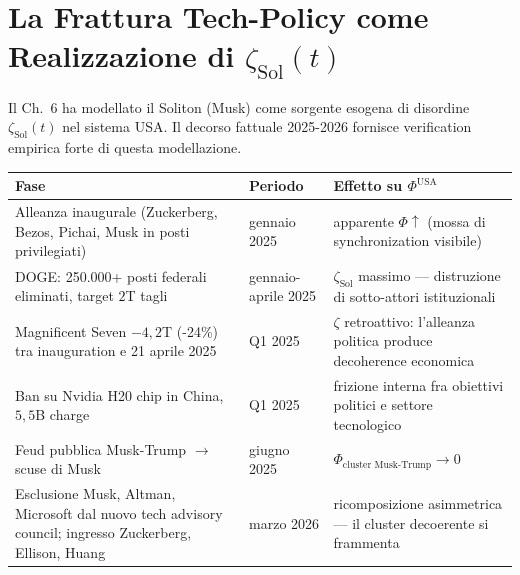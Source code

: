 \section{\texorpdfstring{La Frattura Tech-Policy come Realizzazione di
\(\zeta_{\text{Sol}}(t)\)}{La Frattura Tech-Policy come Realizzazione di \textbackslash zeta\_\{\textbackslash text\{Sol\}\}(t)}}\label{la-frattura-tech-policy-come-realizzazione-di-zeta_textsolt}

Il Ch.~6 ha modellato il Soliton (Musk) come sorgente esogena di
disordine \(\zeta_{\text{Sol}}(t)\) nel sistema USA. Il decorso fattuale
2025-2026 fornisce verification empirica forte di questa modellazione.

{\def\LTcaptype{none} %
{\small\begin{longtable}[]{@{}
  >{\raggedright\arraybackslash}p{}
  >{\raggedright\arraybackslash}p{}
  >{\raggedright\arraybackslash}p{}@{}}
\toprule\noalign{}
\begin{minipage}[b]{\linewidth}\raggedright
Fase
\end{minipage} & \begin{minipage}[b]{\linewidth}\raggedright
Periodo
\end{minipage} & \begin{minipage}[b]{\linewidth}\raggedright
Effetto su \(\Phi^{\text{USA}}\)
\end{minipage} \\
\midrule\noalign{}
\endhead
\bottomrule\noalign{}
\endlastfoot
Alleanza inaugurale (Zuckerberg, Bezos, Pichai, Musk in posti
privilegiati) & 20 gennaio 2025 & apparente \(\Phi \uparrow\) (mossa di
synchronization visibile) \\
DOGE: 250.000+ posti federali eliminati, target \(2\)T tagli &
gennaio-aprile 2025 & \(\zeta_{\text{Sol}}\) massimo --- distruzione di
sotto-attori istituzionali \\
Magnificent Seven \(-4{,}2\)T (-24\%) tra inauguration e 21 aprile 2025
& Q1 2025 & \(\zeta\) retroattivo: l'alleanza politica produce
decoherence economica \\
Ban su Nvidia H20 chip in China, \(5{,}5\)B charge & Q1 2025 & frizione
interna fra obiettivi politici e settore tecnologico \\
Feud pubblica Musk-Trump $\to$ scuse di Musk & giugno 2025 &
\(\Phi_{\text{cluster Musk-Trump}} \to 0\) \\
Esclusione Musk, Altman, Microsoft dal nuovo tech advisory council;
ingresso Zuckerberg, Ellison, Huang & marzo 2026 & ricomposizione
asimmetrica --- il cluster decoerente si frammenta \\
\end{longtable}}
}

